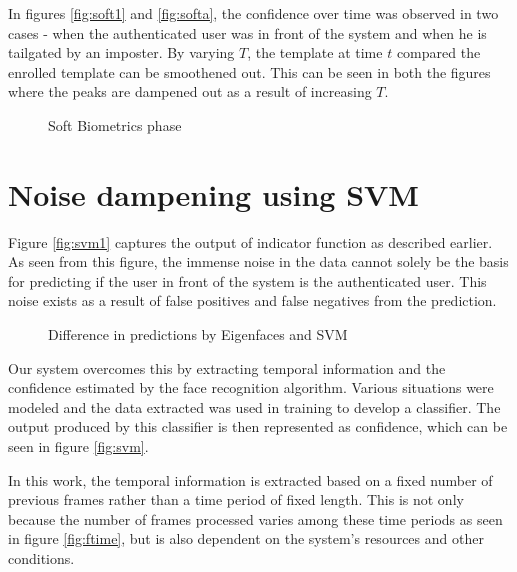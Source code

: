 \documentclass[12pt]{report}			%
\begin{document}
In figures \ref{fig:soft1} and \ref{fig:softa}, the confidence over time was observed in two cases - when the authenticated user was in front of the system and when he is tailgated by an imposter.
By varying $T$, the template at time $t$ compared the enrolled template can be smoothened out.
This can be seen in both the figures where the peaks are dampened out as a result of increasing $T$.

\begin{figure}
	\centering
	\quad
	\caption{Soft Biometrics phase}
\end{figure}

\section{Noise dampening using SVM}
Figure \ref{fig:svm1} captures the output of indicator function as described earlier.
As seen from this figure, the immense noise in the data cannot solely be the basis for predicting if the user in front of the system is the authenticated user.
This noise exists as a result of false positives and false negatives from the prediction. 

\begin{figure}
	\centering
	\quad
	\caption{Difference in predictions by Eigenfaces and SVM}
\end{figure}

Our system overcomes this by extracting temporal information and the confidence estimated by the face recognition algorithm.
Various situations were modeled and the data extracted was used in training to develop a classifier.
The output produced by this classifier is then represented as confidence, which can be seen in figure \ref{fig:svm}.

In this work, the temporal information is extracted based on a fixed number of previous frames rather than a time period of fixed length.
This is not only because the number of frames processed varies among these time periods as seen in figure \ref{fig:ftime}, but is also dependent on the system's resources and other conditions.
\end{document}
